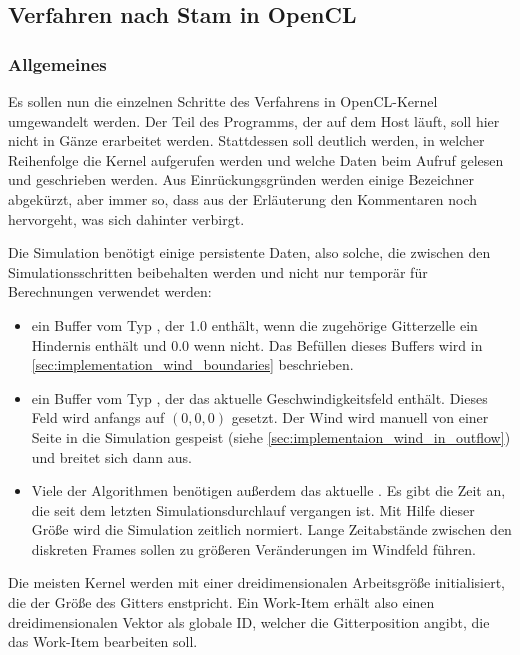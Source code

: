 \subsection{Verfahren nach Stam in OpenCL}

\subsubsection{Allgemeines}
\label{sec:implementation_wind_stam_general}

Es sollen nun die einzelnen Schritte des Verfahrens in OpenCL-Kernel
umgewandelt werden. Der Teil des Programms, der auf dem Host läuft,
soll hier nicht in Gänze erarbeitet werden. Stattdessen soll deutlich
werden, in welcher Reihenfolge die Kernel aufgerufen werden und welche
Daten beim Aufruf gelesen und geschrieben werden. Aus
Einrückungsgründen werden einige Bezeichner abgekürzt, aber immer so,
dass aus der Erläuterung \Pimiddybzw den Kommentaren noch hervorgeht, was
sich dahinter verbirgt.

Die Simulation benötigt einige persistente Daten, also solche, die
zwischen den Simulationsschritten beibehalten werden und nicht nur
temporär für Berechnungen verwendet werden:

\begin{itemize}
\item ein Buffer  vom Typ
, der 1.0 enthält, wenn die zugehörige
Gitterzelle ein Hindernis enthält und 0.0 wenn nicht. Das Befüllen
dieses Buffers wird in
\autoref{sec:implementation_wind_boundaries} beschrieben.
\item ein Buffer  vom Typ
, der das aktuelle Geschwindigkeitsfeld enthält.
Dieses Feld wird anfangs auf $(0,0,0)$ gesetzt. Der Wind wird manuell von
einer Seite in die Simulation gespeist (siehe
\autoref{sec:implementaion_wind_in_outflow}) und breitet sich dann
aus.
\item Viele der Algorithmen benötigen außerdem das aktuelle
 . Es gibt die
Zeit an, die seit dem letzten Simulationsdurchlauf vergangen ist. Mit
Hilfe dieser Größe wird die Simulation zeitlich normiert. Lange
Zeitabstände zwischen den diskreten Frames sollen zu größeren
Veränderungen im Windfeld führen.
\end{itemize}

Die meisten Kernel werden mit einer dreidimensionalen Arbeitsgröße
initialisiert, die der Größe des Gitters enstpricht. Ein Work-Item
erhält also einen dreidimensionalen Vektor als globale ID, welcher die
Gitterposition angibt, die das Work-Item bearbeiten soll.


